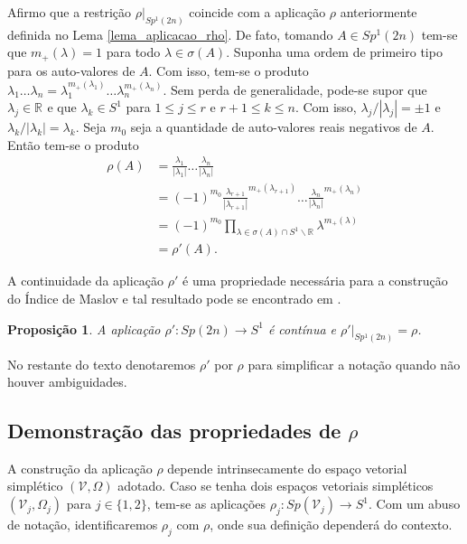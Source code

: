 \documentclass[12pt]{book}
\newtheorem{proposicao}[teorema]{Proposição}
\newcommand{\circulo}{S^{1}}
\newcommand{\complementar}[2]{#1 \backslash #2}
\newcommand{\complexificado}[1]{\mathcal{#1}}
\newcommand{\espectrooperador}[1]{\sigma(#1)}
\newcommand{\gruposimpletico}[1]{Sp(#1)}
\newcommand{\gruposimpleticoespecial}[1]{Sp^{1}(#1)}
\newcommand{\real}[1]{\mathbb{R}^{#1}}
\newcommand{\reta}{\real{}}
\begin{document}
	Afirmo que a restrição $\rho|_{\gruposimpleticoespecial{2n}}$ coincide com a aplicação $\rho$ anteriormente definida no Lema \ref{lema_aplicacao_rho}. De fato, tomando $A \in \gruposimpleticoespecial{2n}$ tem-se que $m_{+}(\lambda) = 1$ para todo $\lambda\in \espectrooperador{A}$. Suponha uma ordem de primeiro tipo para os auto-valores de $A$. Com isso, tem-se o produto $\lambda_{1}\dots \lambda_{n} = \lambda_{1}^{m_{+}(\lambda_{1})}\dots \lambda_{n}^{m_{+}(\lambda_{n})}$. Sem perda de generalidade, pode-se supor que $\lambda_{j} \in \reta$ e que $\lambda_{k}\in \circulo$ para $1\leq j \leq r $ e $r +1\leq k \leq n$. Com isso, $\lambda_{j}/|\lambda_{j}|=\pm 1$ e $\lambda_{k}/|\lambda_{k}| = \lambda_{k}$. Seja $m_{0}$ seja a quantidade de auto-valores reais negativos de $A$. Então tem-se o produto 
	$$
	\begin{aligned}
	\rho(A) 
	&=
	\frac{\lambda_{1}}{|\lambda_{1}|}\dots \frac{\lambda_{n}}{|\lambda_{n}|}
	\\
	&= (-1)^{m_{0}}\frac{\lambda_{r+1}}{|\lambda_{r+1}|}^{m_{+}(\lambda_{r+1})} \dots \frac{\lambda_{n}}{|\lambda_{n}|}^{m_{+}(\lambda_{n})}
	\\
	&=(-1)^{m_{0}}\prod_{\lambda\in \espectrooperador{A}\cap\complementar{\circulo}{\reta}}\lambda^{m_{+}(\lambda)}
	\\
	&= \rho'(A).
	\end{aligned}
	$$

	A continuidade da aplicação $\rho'$ é uma propriedade necessária para a construção do Índice de Maslov e tal resultado pode se encontrado em \cite{audi_floer_homology}.
	
	\begin{proposicao}\label{proposicao_continuidade_rho}
		A aplicação $\rho': \gruposimpletico{2n}\to \circulo$ é contínua e $\rho'|_{\gruposimpleticoespecial{2n}} = \rho$.
	\end{proposicao}
	
	No restante do texto denotaremos $\rho'$ por $\rho$ para simplificar a notação quando não houver ambiguidades.
	
	\subsection*{Demonstração das propriedades de $\rho$}
	
	A construção da aplicação $\rho$ depende intrinsecamente do espaço vetorial simplético $(\complexificado{V}, \Omega)$ adotado. Caso se tenha dois espaços vetoriais simpléticos $(\complexificado{V}_{j}, \Omega_{j})$ para $j\in \{1,2\}$, tem-se as aplicações $\rho_{j}:\gruposimpletico{\complexificado{V}_{j}} \to \circulo$. Com um abuso de notação, identificaremos $\rho_{j}$ com $\rho$, onde sua definição dependerá do contexto.
	
\end{document}
